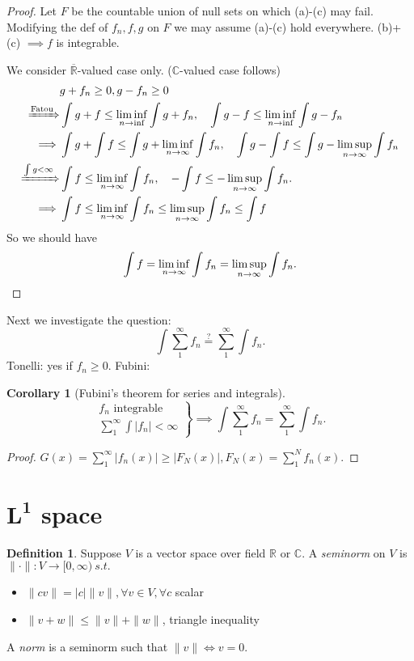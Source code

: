 \documentclass{report}
\newcommand{\R}{\mathbb{R}}
\newcommand{\C}{\mathbb{C}}
\newcommand{\st}{\ s.t.\ }
\newtheorem{corollary}[theorem]{Corollary}
\theoremstyle{definition}
\newtheorem{definition}[theorem]{Definition}
\theoremstyle{remark}
\newcommand*\ttlmath[2]{\texorpdfstring{$\boldsymbol{#1}$}{#2}}
\begin{document}
\begin{proof}
	Let $F$ be the countable union of null sets on which (a)-(c) may fail. Modifying the def of $f_n, f, g$ on $F$ we may assume (a)-(c) hold everywhere. (b)+(c) $\implies f$ is integrable.

	We consider $\overline{\R}$-valued case only. ($\C$-valued case follows)
	\begin{align*}
		& g + f_n \geq 0, g - f_n \geq 0 \\
		\xRightarrow[]{\text{Fatou}} & \int g + f \leq \liminf_{n \to \inf} \int g + f_n,\quad \int g - f \leq \liminf_{n \to \inf} \int g - f_n  \\
		\implies & \int g + \int f \leq \int g + \liminf_{n \to \infty} \int f_n,\quad \int g - \int f \leq \int g - \limsup_{n \to \infty} \int f_n \\
		\xRightarrow[]{\int g < \infty} & \int f \leq \liminf_{n \to \infty} \int f_n,\quad - \int f \leq - \limsup_{n \to \infty} \int f_n. \\
		\implies & \int f \leq \liminf_{n \to \infty} \int f_n \leq \limsup_{n \to \infty} \int f_n \leq \int f
	\end{align*}
	So we should have \[ \int f = \liminf_{n \to \infty} \int f_n = \limsup_{n \to \infty} \int f_n. \qedhere \]
\end{proof}
Next we investigate the question:
\[\int \sum_{1}^\infty f_n \stackrel{\text{?}}{=} \sum_{1}^\infty \int f_n.\]
Tonelli: yes if $f_n \geq 0$.
Fubini:
\begin{corollary}[Fubini's theorem for series and integrals]
	\[\left.\begin{array}{r}
		f_n \text{ integrable} \\
		\displaystyle \sum_1^\infty \int |f_n| < \infty
	\end{array}\right\} \implies \int \sum_{1}^\infty f_n = \sum_{1}^\infty \int f_n.\]
\end{corollary}
\begin{proof}
	$\displaystyle G(x) = \sum_1^\infty |f_n(x)| \geq |F_N(x)|, F_N(x) = \sum_1^N f_n(x)$.
\end{proof}

\section{\ttlmath{L^1}{L-1} space}
\begin{definition}
	Suppose $V$ is a vector space over field $\R$ or $\C$. A \emph{seminorm}
on $V$ is $\|\cdot\|: V \to [0, \infty) \st$
\begin{itemize}
	\item $\|cv\| = |c|\|v\|, \forall v \in V, \forall c$ scalar
	\item $\|v + w\| \leq \|v\| + \|w\|$, triangle inequality
\end{itemize}
A \emph{norm} is a seminorm such that $\|v\| \iff v = 0$.
\end{definition}
\end{document}
